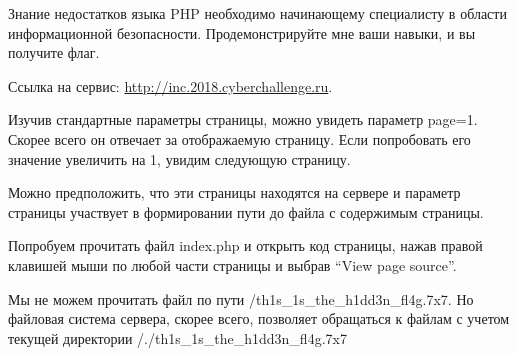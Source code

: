 
Знание недостатков языка PHP необходимо начинающему специалисту в области информационной безопасности. Продемонстрируйте мне ваши навыки, и вы получите флаг.

Ссылка на сервис: \url{http://inc.2018.cyberchallenge.ru}.

\solutionSection

Изучив стандартные параметры страницы, можно увидеть параметр page=1. Скорее всего он отвечает за отображаемую страницу. Если попробовать его значение увеличить на 1, увидим следующую страницу.


Можно предположить, что эти страницы находятся на сервере и параметр страницы участвует в формировании пути до файла с содержимым страницы.

Попробуем прочитать файл index.php и открыть код страницы, нажав правой клавишей мыши по любой части страницы и выбрав “View page source”.


Мы не можем прочитать файл по пути /th1s\_1s\_the\_h1dd3n\_fl4g.7x7. Но файловая система сервера, скорее всего, позволяет обращаться к файлам с учетом текущей директории /./th1s\_1s\_the\_h1dd3n\_fl4g.7x7


